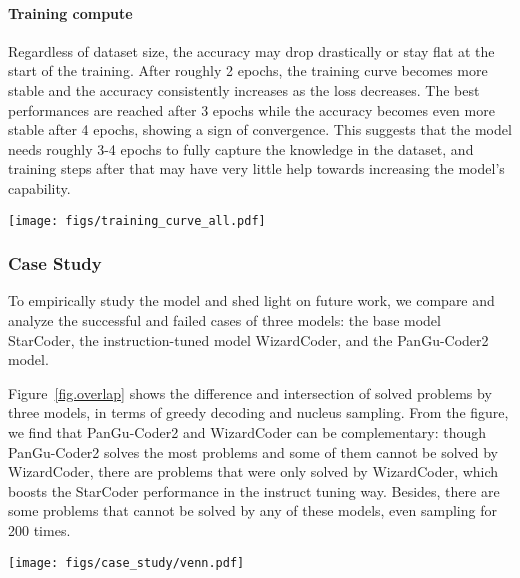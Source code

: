 \documentclass{article}
\newcommand{\pgcoder}{PanGu-Coder2\xspace}
\begin{document}
\paragraph{Training compute}

Regardless of dataset size, the accuracy may drop drastically or stay flat at the start of the training.
After roughly 2 epochs, the training curve becomes more stable and the accuracy consistently increases as the loss decreases. 
The best performances are reached after 3 epochs while the accuracy becomes even more stable after 4 epochs, showing a sign of convergence.
This suggests that the model needs roughly 3-4 epochs to fully capture the knowledge in the dataset, and training steps after that may have very little help towards increasing the model's capability.

\begin{figure*}[tp]
  \centering
  \texttt{[image: figs/training\_curve\_all.pdf]}
  \caption{Performance change when in the training process (pass@1 on HumanEval with greedy decoding). The number of steps in an epoch for (a),(b), and (c) is roughly 2250, 74, and 132 respectively.}
\label{fig.training_curve}
\end{figure*}

\subsubsection{Case Study}

To empirically study the model and shed light on future work, we compare and analyze the successful and failed cases of three models: the base model StarCoder, the instruction-tuned model WizardCoder, and the \pgcoder model.

Figure~\ref{fig.overlap} shows the difference and intersection of solved problems by three models, in terms of greedy decoding and nucleus sampling. From the figure, we find that \pgcoder and WizardCoder can be complementary: though \pgcoder solves the most problems and some of them cannot be solved by WizardCoder, there are problems that were only solved by WizardCoder, which boosts the StarCoder performance in the instruct tuning way. Besides, there are some problems that cannot be solved by any of these models, even sampling for 200 times.

\begin{figure*}[tp]
  \centering
  \texttt{[image: figs/case\_study/venn.pdf]}
  \caption{Numbers of correctly-solved problems by three models on HumanEval. }
\label{fig.overlap}
\end{figure*}
\end{document}
